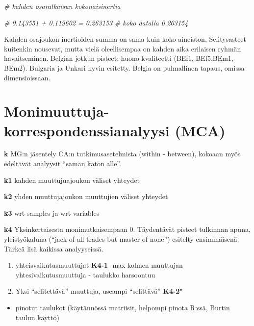 \documentclass[
  finnish,
]{book}
\newenvironment{Shaded}{\begin{snugshade}}{\end{snugshade}}
\newcommand{\CommentTok}[1]{\textcolor[rgb]{0.56,0.35,0.01}{\textit{#1}}}
\providecommand{\tightlist}{%
  \setlength{\itemsep}{0pt}\setlength{\parskip}{0pt}}
\begin{document}
\begin{Shaded}
\begin{Highlighting}[]
\CommentTok{# kahden osaratkaisun kokonaisinertia}

\CommentTok{# 0.143551 + 0.119602 = 0.263153}
\CommentTok{# koko datalla 0.263154}
\end{Highlighting}
\end{Shaded}

Kahden osajoukon inertioiden summa on sama kuin koko aineiston,
Selitysasteet kuitenkin nousevat, mutta vielä oleellisempaa on kahden
aika erilaisen ryhmän havaitseminen. Belgian jotkun pisteet: huono
kvaliteetti (BEf1, BEf5,BEm1, BEm2). Bulgaria ja Unkari hyvin esitetty.
Belgia on pulmallinen tapaus, omissa dimensioissaan.

\hypertarget{monimuuttuja-korrespondenssianalyysi-mca}{%
\chapter{Monimuuttuja-korrespondenssianalyysi
(MCA)}\label{monimuuttuja-korrespondenssianalyysi-mca}}

\textbf{k} MG:n jäsentely CA:n tutkimusasetelmista (within - between),
kokoaan myös edeltävät analyysit ``saman katon alle''.

\textbf{k1} kahden muuttujuajoukon väliset yhteydet

\textbf{k2} yhden muuttujajoukon muuttujien väliset yhteydet

\textbf{k3} wrt samples ja wrt variables

\textbf{k4} Yksinkertaisesta monimutkaisempaan 0. Täydentävät pisteet
tulkinnan apuna, yleistyökaluna (``jack of all trades but master of
none'') esitelty ensimmäisenä. Tärkeä lisä kaikissa analyyseissä.

\begin{enumerate}
\def\labelenumi{\arabic{enumi}.}
\item
  yhteisvaikutusmuuttujat \textbf{K4-1} -max kolmen muuttujan
  yhtesivaikutusmuuttuja - taulukko harsoontuu
\item
  Yksi ``selitettävä'' muuttuja, useampi ``selittävä'' \textbf{K4-2"}
\end{enumerate}

\begin{itemize}
\tightlist
\item
  pinotut taulukot (käytännössä matriisit, helpompi pinota R:ssä, Burtin
  taulun käyttö)
\end{itemize}
\end{document}
